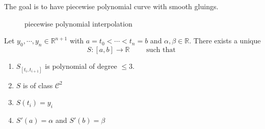 The goal is to have piecewise polynomial curve with smooth gluings. 

\begin{figure}[ht]
    \centering
    \caption{piecewise polynomial interpolation}
    \label{fig:piecewisepoly}
\end{figure}


\begin{ftheo}
    Let $ y_0, \cdots, y_n \in \mathbb{R}^{n+1} $ with $ a=t_0 < \cdots < t_n = b $ and $
    \alpha, \beta \in \mathbb{R}$. There exists a unique 
    \[
        S : [a,b] \to \mathbb{R} \qquad \text{ such that } 
    \]
    \begin{enumerate}[label={(\roman*)}]
        \item $ S _{ [t_i, t_{i+1} ] }^{  }  $ is polynomial of degree $ \leq 3 $. 
        \item $ S $ is of class $ \mathscr{ C } ^2 $
        \item $ S(t_i) = y_i $
        \item $ S'(a) = \alpha  $ and $ S'(b) = \beta  $
    \end{enumerate}
    \label{th:cubicBspline}
\end{ftheo}

